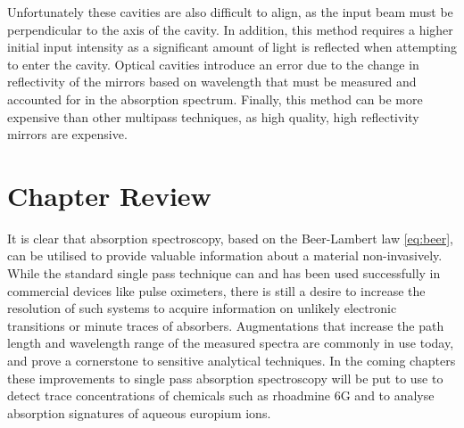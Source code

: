 
Unfortunately these cavities are also difficult to align, as the input beam
must be perpendicular to the axis of the cavity. In addition, this method
requires a higher initial input intensity as a significant amount of light is
reflected when attempting to enter the cavity. Optical cavities introduce an
error due to the change in reflectivity of the mirrors based on wavelength that
must be measured and accounted for in the absorption spectrum. Finally, this
method can be more expensive than other multipass techniques, as high quality,
high reflectivity mirrors are expensive.



\section*{Chapter Review}

It is clear that absorption spectroscopy, based on the Beer-Lambert law
\eqref{eq:beer}, can be utilised to provide valuable information about a
material non-invasively. While the standard single pass technique can and has
been used successfully in commercial devices like pulse oximeters, there is
still a desire to increase the resolution of such systems to acquire
information on unlikely electronic transitions or minute traces of absorbers.
Augmentations that increase the path length and wavelength range of the
measured spectra are commonly in use today, and prove a cornerstone to
sensitive analytical techniques. In the coming chapters these improvements to
single pass absorption spectroscopy will be put to use to detect trace
concentrations of chemicals such as rhoadmine 6G and to analyse absorption
signatures of aqueous europium ions.
